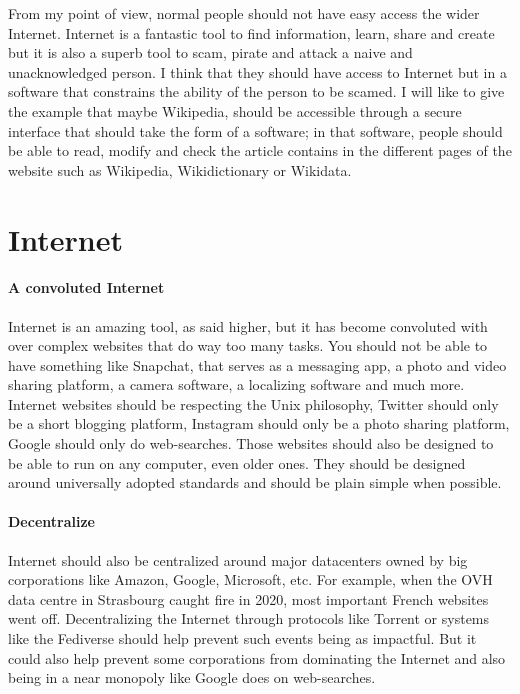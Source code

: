\documentclass[a4paper,10pt]{article}
\begin{document}
From my point of view, normal people should not have easy access the wider Internet. Internet is a fantastic tool to find information, learn, share and create but it is also a superb tool to scam, pirate and attack a naive and unacknowledged person. I think that they should have access to Internet but in a software that constrains the ability of the person to be scamed. I will like to give the example that maybe Wikipedia, should be accessible through a secure interface that should take the form of a software; in that software, people should be able to read, modify and check the article contains in the different pages of the website such as Wikipedia, Wikidictionary or Wikidata.

\section{Internet}

\paragraph{A convoluted Internet}

Internet is an amazing tool, as said higher, but it has become convoluted with over complex websites that do way too many tasks. You should not be able to have something like Snapchat, that serves as a messaging app, a photo and video sharing platform, a camera software, a localizing software and much more. Internet websites should be respecting the Unix philosophy, Twitter should only be a short blogging platform, Instagram should only be a photo sharing platform, Google should only do web-searches. Those websites should also be designed to be able to run on any computer, even older ones. They should be designed around universally adopted standards and should be plain simple when possible.

\paragraph{Decentralize}

Internet should also be centralized around major datacenters owned by big corporations like Amazon, Google, Microsoft, etc. For example, when the OVH data centre in Strasbourg caught fire in 2020, most important French websites went off. Decentralizing the Internet through protocols like Torrent or systems like the Fediverse should help prevent such events being as impactful. But it could also help prevent some corporations from dominating the Internet and also being in a near monopoly like Google does on web-searches.
\end{document}
